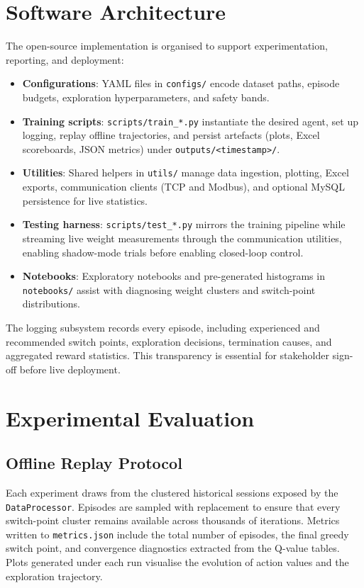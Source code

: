 \documentclass[journal]{IEEEtranTIE}
\begin{document}
\section{Software Architecture}
The open-source implementation is organised to support experimentation, reporting, and deployment:
\begin{itemize}
  \item \textbf{Configurations}: YAML files in \texttt{configs/} encode dataset paths, episode budgets, exploration hyperparameters, and safety bands.
  \item \textbf{Training scripts}: \texttt{scripts/train\_*.py} instantiate the desired agent, set up logging, replay offline trajectories, and persist artefacts (plots, Excel scoreboards, JSON metrics) under \texttt{outputs/<timestamp>/}.
  \item \textbf{Utilities}: Shared helpers in \texttt{utils/} manage data ingestion, plotting, Excel exports, communication clients (TCP and Modbus), and optional MySQL persistence for live statistics.
  \item \textbf{Testing harness}: \texttt{scripts/test\_*.py} mirrors the training pipeline while streaming live weight measurements through the communication utilities, enabling shadow-mode trials before enabling closed-loop control.
  \item \textbf{Notebooks}: Exploratory notebooks and pre-generated histograms in \texttt{notebooks/} assist with diagnosing weight clusters and switch-point distributions.
\end{itemize}
The logging subsystem records every episode, including experienced and recommended switch points, exploration decisions, termination causes, and aggregated reward statistics. This transparency is essential for stakeholder sign-off before live deployment.

\section{Experimental Evaluation}
\subsection{Offline Replay Protocol}
Each experiment draws from the clustered historical sessions exposed by the \texttt{DataProcessor}. Episodes are sampled with replacement to ensure that every switch-point cluster remains available across thousands of iterations. Metrics written to \texttt{metrics.json} include the total number of episodes, the final greedy switch point, and convergence diagnostics extracted from the Q-value tables. Plots generated under each run visualise the evolution of action values and the exploration trajectory.
\end{document}
